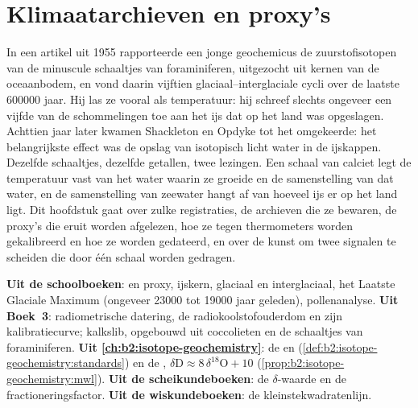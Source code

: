 \chapter{Klimaatarchieven en proxy's}\label{ch:b2:climate-proxies}

In een artikel uit 1955 rapporteerde een jonge geochemicus de zuurstofisotopen van de minuscule schaaltjes van
foraminiferen, uitgezocht uit kernen van de oceaanbodem, en vond daarin vijftien glaciaal--interglaciale cycli over de
laatste \num{600000} jaar. Hij las ze vooral als temperatuur: hij schreef slechts ongeveer een vijfde van
de schommelingen toe aan het ijs dat op het land was opgeslagen. Achttien jaar later kwamen Shackleton en Opdyke tot het
omgekeerde: het belangrijkste effect was de opslag van isotopisch licht water in de
ijskappen. Dezelfde schaaltjes, dezelfde getallen, twee lezingen. Een schaal van calciet legt de
temperatuur vast van het water waarin ze groeide en de samenstelling van dat water, en de samenstelling van
zeewater hangt af van hoeveel ijs er op het land ligt. Dit hoofdstuk gaat over zulke registraties, de
archieven die ze bewaren, de proxy's die eruit worden afgelezen, hoe ze tegen thermometers worden gekalibreerd
en hoe ze worden gedateerd, en over de kunst om twee signalen te scheiden die door één schaal worden gedragen.

\begin{recall}
\textbf{Uit de schoolboeken}:  en proxy, ijskern, glaciaal en
interglaciaal, het Laatste Glaciale Maximum (ongeveer \num{23000} tot \num{19000} jaar geleden),
pollenanalyse. \textbf{Uit Boek~3}: radiometrische datering, de radiokoolstofouderdom en zijn
kalibratiecurve; kalkslib, opgebouwd uit coccolieten en de schaaltjes van foraminiferen.
\textbf{Uit \cref{ch:b2:isotope-geochemistry}}: de   en 
(\cref{def:b2:isotope-geochemistry:standards}) en de , $\delta\mathrm{D}
\approx 8\,\delta^{18}\mathrm{O} + 10$ (\cref{prop:b2:isotope-geochemistry:mwl}). \textbf{Uit de
scheikundeboeken}: de $\delta$-waarde en de fractioneringsfactor. \textbf{Uit de
wiskundeboeken}: de kleinstekwadratenlijn.
\end{recall}

